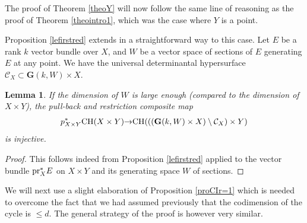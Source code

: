 \documentclass[10pt]{article}
\newtheorem{lemm}[theo]{Lemma}
\begin{document}
The proof of Theorem \ref{theoY} will now follow the same line of reasoning as the proof of Theorem \ref{theointro1}, which was the case where $Y$ is  a point.

Proposition \ref{lefirstred} extends in a straightforward way to this case. Let $E$ be  a rank $k$ vector bundle  over $X$, and $W$ be a vector space  of sections of $E$ generating $E$ at any point.
We have  the universal determinantal hypersurface $\mathcal{C}_X\subset \mathbf{G}(k,W)\times X$.

\begin{lemm}\label{lefirstredY} If the dimension of $W$ is large enough (compared to
the dimension of $X\times Y$), the pull-back and restriction composite map
$${p}_{X\times Y}^*{\rm CH}(X\times Y){\rightarrow} {\rm CH}(((\mathbf{G}(k,W)\times X)\setminus \mathcal{C}_X)\times Y)$$
is injective.
\end{lemm}
\begin{proof}
This follows indeed from Proposition \ref{lefirstred} applied to the vector bundle ${\rm pr}_X^*E$ on
$X\times Y$ and its generating space $W$ of sections.\end{proof}
 We will next  use a slight elaboration of Proposition \ref{proCIr=1} which is needed to overcome the fact that we had assumed previously that the codimension of the cycle
is $\leq d$. The general strategy of the proof is  however very similar.
\end{document}
